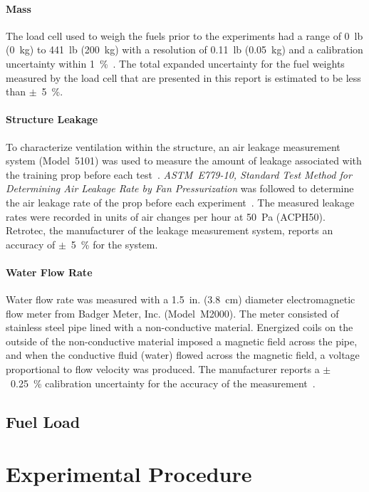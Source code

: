 \documentclass[12pt,oneside]{book}
\begin{document}
\subsubsection*{Mass}
The load cell used to weigh the fuels prior to the experiments had a range of 0~lb (0~kg) to 441~lb (200~kg) with a resolution of 0.11~lb (0.05~kg) and a calibration uncertainty within 1~\%~\cite{Ohaus:2000}. The total expanded uncertainty for the fuel weights measured by the load cell that are presented in this report is estimated to be less than $\pm$~5~\%.

\subsubsection*{Structure Leakage} 
To characterize ventilation within the structure, an air leakage measurement system (Model~5101) was used to measure the amount of leakage associated with the training prop before each test~\cite{retrotec:leakage}. \textit{ASTM~E779-10, Standard Test Method for Determining Air Leakage Rate by Fan Pressurization} was followed to determine the air leakage rate of the prop before each experiment~\cite{astm_e779}. The measured leakage rates were recorded in units of air changes per hour at 50~Pa (ACPH50). Retrotec, the manufacturer of the leakage measurement system, reports an accuracy of $\pm$~5~\% for the system.

\subsubsection*{Water Flow Rate}
Water flow rate was measured with a 1.5~in. (3.8~cm) diameter electromagnetic flow meter from Badger Meter, Inc. (Model~M2000). The meter consisted of stainless steel pipe lined with a non-conductive material. Energized coils on the outside of the non-conductive material imposed a magnetic field across the pipe, and when the conductive fluid (water) flowed across the magnetic field, a voltage proportional to flow velocity was produced. The manufacturer reports a $\pm$~0.25~\% calibration uncertainty for the accuracy of the measurement~\cite{Badger:2015}.

\section{Fuel Load}

\chapter{Experimental Procedure}
\label{chap:exp_procedure}
\end{document}
